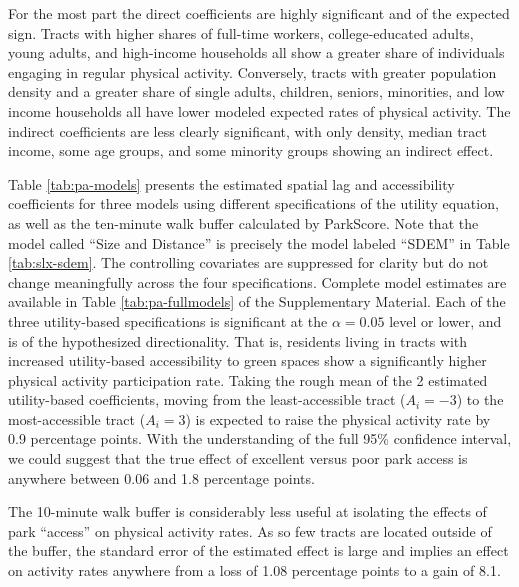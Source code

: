 \documentclass[shortAfour,sageh.bst]{sagej}
\begin{document}
For the most part the direct coefficients are highly significant and of
the expected sign. Tracts with higher shares of full-time workers,
college-educated adults, young adults, and high-income households all
show a greater share of individuals engaging in regular physical
activity. Conversely, tracts with greater population density and a
greater share of single adults, children, seniors, minorities, and low
income households all have lower modeled expected rates of physical
activity. The indirect coefficients are less clearly significant, with
only density, median tract income, some age groups, and some minority
groups showing an indirect effect.

Table \ref{tab:pa-models} presents the estimated spatial lag and
accessibility coefficients for three models using different
specifications of the utility equation, as well as the ten-minute walk
buffer calculated by ParkScore. Note that the model called ``Size and
Distance'' is precisely the model labeled ``SDEM'' in Table
\ref{tab:slx-sdem}. The controlling covariates are suppressed for
clarity but do not change meaningfully across the four specifications.
Complete model estimates are available in Table \ref{tab:pa-fullmodels}
of the Supplementary Material. Each of the three utility-based
specifications is significant at the \(\alpha = 0.05\) level or lower,
and is of the hypothesized directionality. That is, residents living in
tracts with increased utility-based accessibility to green spaces show a
significantly higher physical activity participation rate. Taking the
rough mean of the 2 estimated utility-based coefficients, moving from
the least-accessible tract (\(A_i = -3\)) to the most-accessible tract
(\(A_i = 3\)) is expected to raise the physical activity rate by 0.9
percentage points. With the understanding of the full 95\% confidence
interval, we could suggest that the true effect of excellent versus poor
park access is anywhere between 0.06 and 1.8 percentage points.

The 10-minute walk buffer is considerably less useful at isolating the
effects of park ``access'' on physical activity rates. As so few tracts
are located outside of the buffer, the standard error of the estimated
effect is large and implies an effect on activity rates anywhere from a
loss of 1.08 percentage points to a gain of 8.1.
\end{document}

